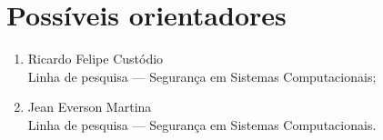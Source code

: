 \documentclass[12pt]{article}
\begin{document}
\section{Possíveis orientadores}

\begin{enumerate}
    \item Ricardo Felipe Custódio \\
    Linha de pesquisa --- Segurança em Sistemas Computacionais;
    \item Jean Everson Martina \\
    Linha de pesquisa --- Segurança em Sistemas Computacionais.
\end{enumerate}



\end{document}
